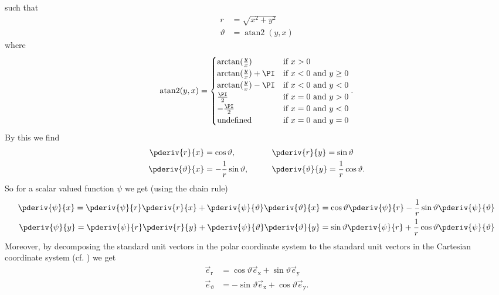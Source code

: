such that
\begin{align*}
	r &= \sqrt{x^2+y^2}\\
	\vartheta &= \operatorname{atan2}(y,x)
\end{align*}
where
\begin{equation*}
	\operatorname{atan2}(y,x) = \begin{cases}
	\arctan(\frac{y}{x}) & \mbox{if } x > 0\\
	\arctan(\frac{y}{x}) + \PI & \mbox{if } x < 0 \mbox{ and } y \ge 0\\
	\arctan(\frac{y}{x}) - \PI & \mbox{if } x < 0 \mbox{ and } y < 0\\
	\frac{\PI}{2} & \mbox{if } x = 0 \mbox{ and } y > 0\\
	-\frac{\PI}{2} & \mbox{if } x = 0 \mbox{ and } y < 0\\
	\text{undefined} & \mbox{if } x = 0 \mbox{ and } y = 0
	\end{cases}.
\end{equation*}
By this we find
\begin{alignat*}{3}
	\pderiv{r}{x} &= \cos\vartheta,\qquad	&&\pderiv{r}{y} = \sin\vartheta\\
	\pderiv{\vartheta}{x} &= -\frac{1}{r}\sin\vartheta,\qquad	&&\pderiv{\vartheta}{y} = \frac{1}{r}\cos\vartheta.
\end{alignat*}
So for a scalar valued function $\psi$ we get (using the chain rule)
\begin{align}
\label{Eq2:derivativesInPolar}
\begin{split}
	\pderiv{\psi}{x} = \pderiv{\psi}{r}\pderiv{r}{x} + \pderiv{\psi}{\vartheta}\pderiv{\vartheta}{x} = \cos\vartheta\pderiv{\psi}{r} -\frac{1}{r}\sin\vartheta \pderiv{\psi}{\vartheta}\\
	\pderiv{\psi}{y} = \pderiv{\psi}{r}\pderiv{r}{y} + \pderiv{\psi}{\vartheta}\pderiv{\vartheta}{y} = \sin\vartheta\pderiv{\psi}{r} + \frac{1}{r}\cos\vartheta\pderiv{\psi}{\vartheta}
\end{split}
\end{align}
Moreover, by decomposing the standard unit vectors in the polar coordinate system to the standard unit vectors in the Cartesian coordinate system (cf. ) we get
\begin{align*}
	\vec{e}_{\mathrm{r}} &= \cos\vartheta\vec{e}_{\mathrm{x}} + \sin\vartheta\vec{e}_{\mathrm{y}}\\
	\vec{e}_{\upvartheta} &= -\sin\vartheta\vec{e}_{\mathrm{x}}+\cos\vartheta\vec{e}_{\mathrm{y}}.
\end{align*}
